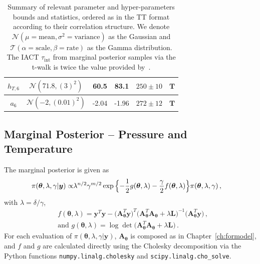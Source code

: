 \begin{table}[ht!]
\begin{tabular}{ |c||c|c|c|c|c|   }
		$h_{T,6}$ &  $\mathcal{N}(71.8,(3)^2)$&60.5 &83.1&$250\pm 10$&$\bm{T}$\\ \hline
		$a_{6}$ & $\mathcal{N}(-2,(0.01)^2)$ &-2.04 &-1.96&$272\pm 12$&$\bm{T}$\\
		\hline
	\end{tabular}
	\caption[Summary of relevant parameter characteristics, bounds and sampling statistics.]{Summary of relevant parameter and hyper-parameters bounds and statistics, ordered as in the TT format according to their correlation structure. We denote $\mathcal{N}(\mu= \text{mean},\sigma^2= \text{variance})$ as the Gaussian and $\mathcal{T}(\alpha = \text{scale}, \beta = \text{rate})$ as the Gamma distribution. The IACT $\tau_{\text{int}}$ from marginal posterior samples via the t-walk is twice the value provided by~\cite{UwerrM, drikHesse}.}
	\label{tab:priors}
\end{table}
\clearpage

\subsection{Marginal Posterior -- Pressure and Temperature}
The marginal posterior is given as
\begin{align}
	\pi( \bm{\theta},\lambda,\gamma  | \bm{y}) \propto &  \lambda^{n/2} \gamma^{m/2}   \exp{ \Bigl\{ - \frac{1}{2} g ( \bm{\theta},\lambda) - \frac{\gamma}{2} f (\bm{\theta},\lambda) \Bigr\}} \pi(\bm{\theta},\lambda,\gamma ) \, ,
	\label{eq:MargPostFull}
\end{align}
with $\lambda= \delta / \gamma$,
\begin{subequations}
	\label{eq:fandgTrue}
	\begin{align}
		&f ( \bm{\theta},\lambda) = \bm{y}^T \bm{y} - \big(\bm{A}_{\bm{\theta}}^T \bm{y}\big)^T \big(\bm{A}_{\bm{\theta}}^T  \bm{A}_{\bm{\theta}} + \lambda \bm{L}\big)^{-1} \big(\bm{A}_{\bm{\theta}}^T \bm{y}\big)  \label{eq:fFullAppl} \, ,  \\
		&\text{and } g(\bm{\theta},\lambda) = \log \det \big(\bm{A}_{\bm{\theta}}^T  \bm{A}_{\bm{\theta}} + \lambda \bm{L}\big) \label{eq:gFullAppl} \, .
	\end{align}
\end{subequations}
For each evaluation of $\pi( \bm{\theta},\lambda,\gamma  | \bm{y})$, $\bm{A}_{\bm{\theta}}$ is composed as in Chapter~\ref{ch:formodel}, and $f$ and $g$ are calculated directly using the Cholesky decomposition via the Python functions \texttt{numpy.linalg.cholesky} and \texttt{scipy.linalg.cho\_solve}.

